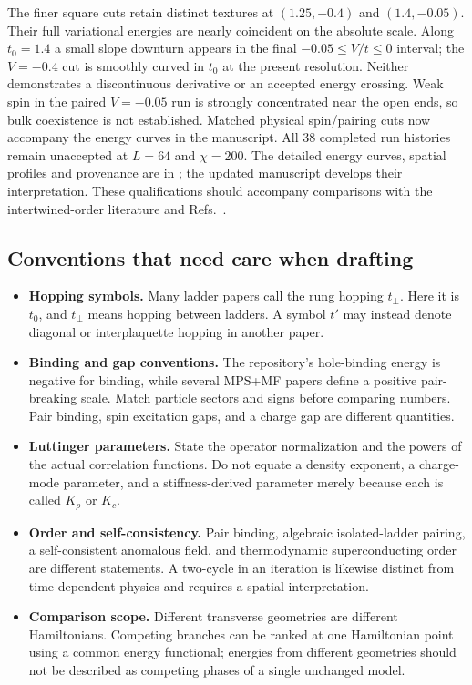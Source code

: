 \documentclass[11pt]{article}
\begin{document}
The finer square cuts retain distinct textures at $(1.25,-0.4)$ and
$(1.4,-0.05)$. Their full variational energies are nearly coincident on the
absolute scale. Along $t_0=1.4$ a small slope downturn appears in the final
$-0.05\le V/t\le0$ interval; the $V=-0.4$ cut is smoothly curved in $t_0$
at the present resolution. Neither demonstrates a discontinuous derivative
or an accepted energy crossing. Weak spin in the paired $V=-0.05$ run is
strongly concentrated near the open ends, so bulk coexistence is not
established. Matched physical spin/pairing cuts now accompany the energy
curves in the manuscript. All 38 completed run histories remain unaccepted
at $L=64$ and $\chi=200$. The detailed energy curves, spatial profiles and
provenance are in ; the
updated manuscript develops their interpretation. These qualifications
should accompany comparisons with the intertwined-order literature and
Refs.~\citep{Bollmark2023,Bollmark2025}.

\subsection*{Conventions that need care when drafting}
\begin{itemize}
\item \textbf{Hopping symbols.} Many ladder papers call the rung hopping $t_\perp$. Here it is $t_0$, and $t_\perp$ means hopping between ladders. A symbol $t'$ may instead denote diagonal or interplaquette hopping in another paper.
\item \textbf{Binding and gap conventions.} The repository's hole-binding energy is negative for binding, while several MPS+MF papers define a positive pair-breaking scale. Match particle sectors and signs before comparing numbers. Pair binding, spin excitation gaps, and a charge gap are different quantities.
\item \textbf{Luttinger parameters.} State the operator normalization and the powers of the actual correlation functions. Do not equate a density exponent, a charge-mode parameter, and a stiffness-derived parameter merely because each is called $K_\rho$ or $K_c$.
\item \textbf{Order and self-consistency.} Pair binding, algebraic isolated-ladder pairing, a self-consistent anomalous field, and thermodynamic superconducting order are different statements. A two-cycle in an iteration is likewise distinct from time-dependent physics and requires a spatial interpretation.
\item \textbf{Comparison scope.} Different transverse geometries are different Hamiltonians. Competing branches can be ranked at one Hamiltonian point using a common energy functional; energies from different geometries should not be described as competing phases of a single unchanged model.
\end{itemize}


\begingroup
\raggedright
\renewcommand{\bibpreamble}{\interlinepenalty=10000}
\endgroup
\end{document}
